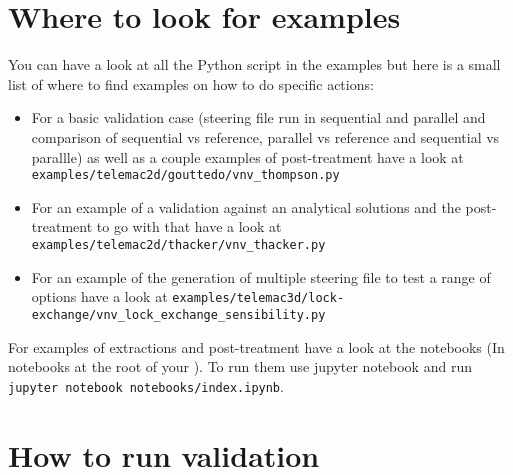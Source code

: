 \section{Where to look for examples}
You can have a look at all the Python script in the examples but here is a
small list of where to find examples on how to do specific actions:
\begin{itemize}
\item For a basic validation case (steering file run in sequential and parallel
  and comparison of sequential vs reference, parallel vs reference and
    sequential vs parallle) as well as a couple examples of post-treatment have
    a look at \verb!examples/telemac2d/gouttedo/vnv_thompson.py!
\item For an example of a validation against an analytical solutions and the
  post-treatment to go with that have a look at
    \verb!examples/telemac2d/thacker/vnv_thacker.py!
\item For an example of the generation of multiple steering file to test a
  range of options have a look at
    \verb!examples/telemac3d/lock-exchange/vnv_lock_exchange_sensibility.py!
\end{itemize}

For examples of extractions and post-treatment have a look at the notebooks (In
notebooks at the root of your \telemacsystem). To run them use jupyter notebook
and run \verb!jupyter notebook notebooks/index.ipynb!.

\section{How to run validation}

